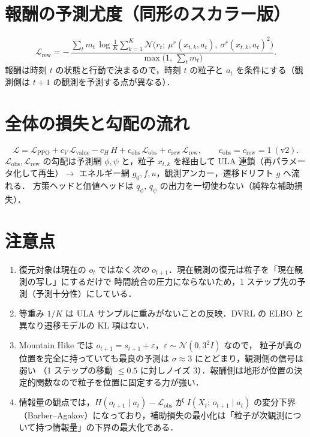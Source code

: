 \documentclass[a4paper,11pt]{article}
\begin{document}
\section{報酬の予測尤度（同形のスカラー版）}

\begin{equation}
  \mathcal{L}_{\mathrm{rew}}
  = -\,\frac{\sum_{t} m_t\,
      \log \frac{1}{K}\sum_{k=1}^{K}
      \mathcal{N}\!\bigl(r_t;\ \mu^r(x_{t,k},a_t),\ \sigma^{r}(x_{t,k},a_t)^{2}\bigr)}
    {\max\!\bigl(1,\ \sum_t m_t\bigr)} .
  \label{eq:lrew}
\end{equation}
報酬は時刻 $t$ の状態と行動で決まるので，時刻 $t$ の粒子と $a_t$ を条件にする（観測側は $t+1$ の観測を予測する点が異なる）．

\section{全体の損失と勾配の流れ}

\begin{equation}
  \mathcal{L}
  = \mathcal{L}_{\mathrm{PPO}}
  + c_V\,\mathcal{L}_{\mathrm{value}}
  - c_H\,H
  + c_{\mathrm{obs}}\,\mathcal{L}_{\mathrm{obs}}
  + c_{\mathrm{rew}}\,\mathcal{L}_{\mathrm{rew}},
  \qquad c_{\mathrm{obs}}=c_{\mathrm{rew}}=1\ (\text{v2}).
  \label{eq:total}
\end{equation}
$\mathcal{L}_{\mathrm{obs}},\mathcal{L}_{\mathrm{rew}}$ の勾配は予測網 $\phi,\psi$ と，粒子 $x_{t,k}$ を経由して
ULA 連鎖（再パラメータ化して再生）$\to$ エネルギー網 $g_0,f,u$，観測アンカー，遷移ドリフト $g$ へ流れる．
方策ヘッドと価値ヘッドは $q_\phi,\,q_\psi$ の出力を一切使わない（純粋な補助損失）．

\section{注意点}

\begin{enumerate}
  \item 復元対象は現在の $o_t$ ではなく\emph{次の} $o_{t+1}$．現在観測の復元は粒子を「現在観測の写し」にするだけで
        時間統合の圧力にならないため，1 ステップ先の予測（予測十分性）にしている．
  \item 等重み $1/K$ は ULA サンプルに重みがないことの反映．DVRL の ELBO と異なり遷移モデルの KL 項はない．
  \item Mountain Hike では $o_{t+1}=s_{t+1}+\varepsilon$，$\varepsilon\sim\mathcal{N}(0,3^2 I)$ なので，
        粒子が真の位置を完全に持っていても最良の予測は $\sigma\approx 3$ にとどまり，観測側の信号は弱い
        （1 ステップの移動 $\le 0.5$ に対しノイズ 3）．報酬側は地形が位置の決定的関数なので粒子を位置に固定する力が強い．
  \item 情報量の観点では，$H(o_{t+1}\mid a_t)-\mathcal{L}_{\mathrm{obs}}$ が $I(X_t;\,o_{t+1}\mid a_t)$ の変分下界
        （Barber--Agakov）になっており，補助損失の最小化は「粒子が次観測について持つ情報量」の下界の最大化である．
\end{enumerate}
\end{document}
